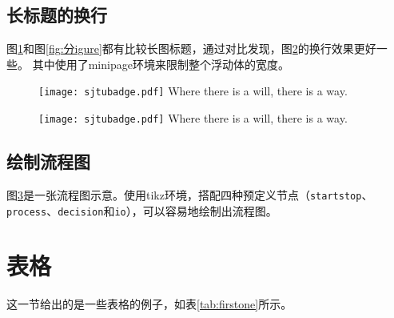 \subsection{长标题的换行}
\label{sec:longcaption}

图\ref{fig:longcaptionbad}和图\ref{fig:分igure}都有比较长图标题，通过对比发现，图\ref{fig:longcaptiongood}的换行效果更好一些。
其中使用了minipage环境来限制整个浮动体的宽度。

\begin{figure}[!htp]
  \centering
  \texttt{[image: sjtubadge.pdf]}
    {Where there is a will, there is a way.}
 \label{fig:longcaptionbad}
\end{figure}

\begin{figure}[!htbp]
  \centering
  \begin{minipage}[b]{0.6\textwidth}
    \centering
    \texttt{[image: sjtubadge.pdf]}
      {Where there is a will, there is a way.}
    \label{fig:longcaptiongood}
  \end{minipage}     
\end{figure}

\subsection{绘制流程图}

图\ref{fig:flow_chart}是一张流程图示意。使用tikz环境，搭配四种预定义节点（\verb+startstop+、\verb+process+、\verb+decision+和\verb+io+），可以容易地绘制出流程图。
\begin{figure}[!htp]
    \centering
    \resizebox{6cm}{!}{}
    \label{fig:flow_chart}
\end{figure}
  
\clearpage

\section{表格}
\label{sec:tab}

这一节给出的是一些表格的例子，如表\ref{tab:firstone}所示。

